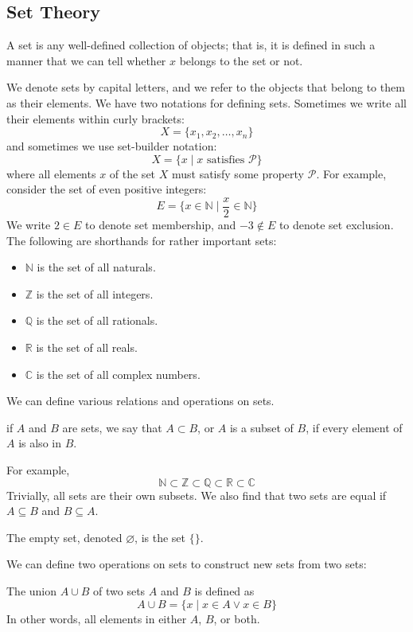 \documentclass[12pt, letterpaper]{report}
\begin{document}
\subsection*{Set Theory}
\begin{definition}[Set]
	A set is any well-defined collection of objects; that is, it is defined in such a manner that we can tell whether \(x\) belongs to the set or not.
\end{definition}
We denote sets by capital letters, and we refer to the objects that belong to them as their elements. We have two notations for defining sets. Sometimes we write all their elements within curly brackets:
\[
	X=\{ x_1,x_2,\ldots,x_n \} 
\]
and sometimes we use set-builder notation:
\[
	X=\{ x\mid x\text{ satisfies }\mathcal{P}   \} 
\]
where all elements \(x\) of the set \(X\) must satisfy some property \(\mathcal{P} \). For example, consider the set of even positive integers:
\[
	E=\{ x\in\mathbb{N} \mid \frac{x}{2}\in\mathbb{N}  \}
\]
We write \(2\in E\) to denote set membership, and \(-3\notin E\) to denote set exclusion.\\
The following are shorthands for rather important sets:
\begin{itemize}
	\item \(\mathbb{N} \) is the set of all naturals.
	\item \(\mathbb{Z} \) is the set of all integers. 
	\item \(\mathbb{Q} \) is the set of all rationals. 
	\item \(\mathbb{R} \) is the set of all reals. 
	\item \(\mathbb{C} \) is the set of all complex numbers.
\end{itemize}
We can define various relations and operations on sets.
\begin{definition}[Subset]
	if \(A\) and \(B\) are sets, we say that \(A\subset B\), or \(A\) is a subset of \(B\), if every element of \(A\) is also in \(B\).
\end{definition}
For example,
\[
	\mathbb{N} \subset\mathbb{Z} \subset\mathbb{Q} \subset\mathbb{R} \subset\mathbb{C} 
\]
Trivially, all sets are their own subsets. We also find that two sets are equal if \(A\subseteq B\) and \(B\subseteq A\).
\begin{definition}
	The empty set, denoted \(\varnothing \), is the set \(\{  \} \).
\end{definition}
We can define two operations on sets to construct new sets from two sets:
\begin{definition}[Union]
	The union \(A\cup B\) of two sets \(A\) and \(B\) is defined as 
	\[
		A\cup B=\{ x\mid x\in A \lor x\in B\} 
	\]
	In other words, all elements in either \(A\), \(B\), or both.
\end{definition}
\end{document}
